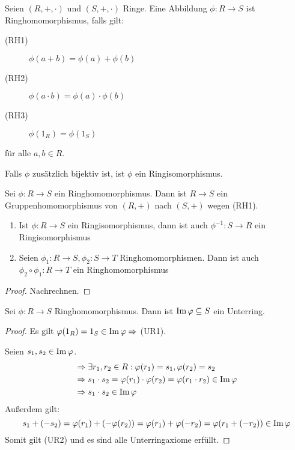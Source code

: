 \documentclass[12pt,a4paper]{scrartcl}
\begin{document}
\begin{defi}
	Seien $(R,+,\cdot)$ und $(S,+,\cdot)$ Ringe. Eine Abbildung $\phi\colon R\to S$ ist Ringhomomorphismus, falls gilt:
	\begin{description}
		\item[(RH1)] $\phi (a+b) = \phi (a)+\phi(b)$
		\item[(RH2)]$\phi(a\cdot b) = \phi(a)\cdot \phi(b)$
		\item[(RH3)]$\phi(1_R) = \phi(1_S)$
	\end{description}
	für alle $a,b\in R$.
	
	Falls $\phi$ zusätzlich bijektiv ist, ist $\phi$ ein Ringisomorphismus.
\end{defi}

\begin{bem}
	Sei $\phi\colon R\to S$ ein Ringhomomorphismus. Dann ist $R\to S$ ein Gruppenhomomorphismus von $(R,+)$ nach $(S,+)$ wegen (RH1).
\end{bem}

\begin{lem}
	\leavevmode
	\begin{enumerate}
		\item Ist $\phi\colon R\to S$ ein Ringisomorphismus, dann ist auch $\phi^{-1}\colon S\to R$ ein Ringisomorphismus
		\item Seien $\phi_1\colon R\to S, \phi_2\colon S\to T$ Ringhomomorphismen. Dann ist auch $\phi_2\circ\phi_1\colon R\to T$ ein Ringhomomorphismus
	\end{enumerate}
\end{lem}
\begin{proof}
	Nachrechnen.
\end{proof}


\begin{lem}
	Sei $\phi\colon R\to S$ Ringhomomorphismus. Dann ist $\operatorname{Im}\varphi\subseteq S$ ein Unterring.
\end{lem}

\begin{proof}
	Es gilt $\varphi(1_R) = 1_S\in\operatorname{Im}\varphi\Rightarrow$ (UR1).
	
	Seien $s_1, s_2\in\operatorname{Im}\varphi$.
	\begin{align*}
		&\Rightarrow \exists r_1,r_2\in R: \varphi (r_1) = s_1, \varphi (r_2 )= s_2 \\
		&\Rightarrow s_1\cdot s_2 = \varphi (r_1)\cdot \varphi (r_2) = \varphi(r_1\cdot r_2)\in \operatorname{Im}\varphi \\
		&\Rightarrow s_1\cdot s_2\in \operatorname{Im}\varphi
	\end{align*}
	Außerdem gilt:
	\begin{equation*}
		s_1+(-s_2) = \varphi (r_1) + (-\varphi (r_2)) = \varphi (r_1)+\varphi (-r_2) = \varphi (r_1+(-r_2))\in\operatorname{Im}\varphi
	\end{equation*}
	Somit gilt (UR2) und es sind alle Unterringaxiome erfüllt.
\end{proof}
\end{document}
